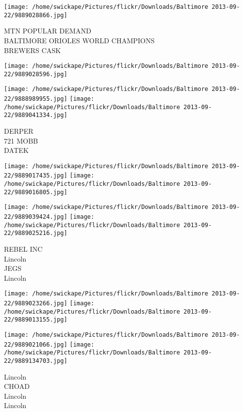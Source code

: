 \documentclass[10pt,letterpaper]{article}
\begin{document}
\texttt{[image: /home/swickape/Pictures/flickr/Downloads/Baltimore 2013-09-22/9889028866.jpg]}

MTN POPULAR DEMAND\\
BALTIMORE ORIOLES WORLD CHAMPIONS\\
BREWERS CASK\\
\pagebreak

\texttt{[image: /home/swickape/Pictures/flickr/Downloads/Baltimore 2013-09-22/9889028596.jpg]}

\vspace{0.25in}
\texttt{[image: /home/swickape/Pictures/flickr/Downloads/Baltimore 2013-09-22/9888989955.jpg]}
\texttt{[image: /home/swickape/Pictures/flickr/Downloads/Baltimore 2013-09-22/9889041334.jpg]}

DERPER\\
721 MOBB\\
DATEK\\
\pagebreak

\texttt{[image: /home/swickape/Pictures/flickr/Downloads/Baltimore 2013-09-22/9889017435.jpg]}
\texttt{[image: /home/swickape/Pictures/flickr/Downloads/Baltimore 2013-09-22/9889016805.jpg]}

\texttt{[image: /home/swickape/Pictures/flickr/Downloads/Baltimore 2013-09-22/9889039424.jpg]}
\texttt{[image: /home/swickape/Pictures/flickr/Downloads/Baltimore 2013-09-22/9889025216.jpg]}

REBEL INC\\
Lincoln\\
JEGS\\
Lincoln\\
\pagebreak

\texttt{[image: /home/swickape/Pictures/flickr/Downloads/Baltimore 2013-09-22/9889023266.jpg]}
\texttt{[image: /home/swickape/Pictures/flickr/Downloads/Baltimore 2013-09-22/9889013155.jpg]}

\texttt{[image: /home/swickape/Pictures/flickr/Downloads/Baltimore 2013-09-22/9889021066.jpg]}
\texttt{[image: /home/swickape/Pictures/flickr/Downloads/Baltimore 2013-09-22/9889134703.jpg]}

Lincoln\\
CHOAD\\
Lincoln\\
Lincoln\\
\pagebreak
\end{document}
